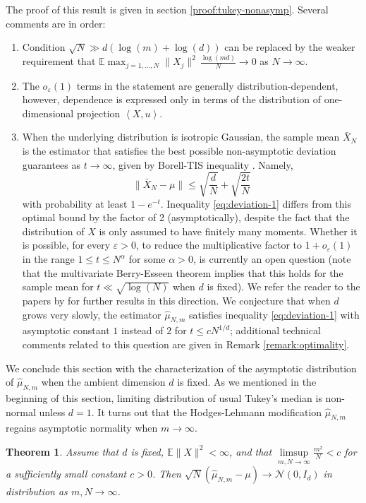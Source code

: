 \documentclass[12pt]{article}
\newcommand{\eps}{\varepsilon}
\newcommand{\wh}{\widehat}
\def\l{\left}
\def\r{\right}
\newcommand{\mb}{\mathbb}
\newcommand{\dotp}[2]{\left\langle#1,#2\right\rangle}
\newtheorem{theorem}{Theorem}%
\theoremstyle{thmstyletwo}%
\theoremstyle{thmstylethree}%
\begin{document}
\noindent The proof of this result is given in section \ref{proof:tukey-nonasymp}. Several comments are in order:
\begin{enumerate}
    \item[(i)] Condition $\sqrt N\gg d(\log(m)+\log(d))$ can be replaced by the weaker requirement that $\mb E\max_{j=1,\ldots,N} \|X_j\|^2\,\frac{\log(md)}{N}\to 0$ as $N\to\infty$.
    \item[(ii)] The $o_\eps(1)$ terms in the statement are generally distribution-dependent, however, dependence is expressed only in terms of the distribution of one-dimensional projection $\dotp{X}{u}$.
    \item[(iii)] 
    When the underlying distribution is isotropic Gaussian, the sample mean $\bar X_N$ is the estimator that satisfies the best possible non-asymptotic deviation guarantees as $t\to\infty$, given by Borell-TIS inequality \citep{borell1975brunn,tsirel2006norms}. Namely, 
    \[
    \|\bar X_N - \mu\|\leq \sqrt{\frac{d}{N}} + \sqrt{\frac{2t}{N}}
    \]
    with probability at least $1-e^{-t}$. 
    Inequality \eqref{eq:deviation-1} differs from this optimal bound by the factor of 2 (asymptotically), despite the fact that the distribution of $X$ is only assumed to have finitely many moments. Whether it is possible, for every $\eps>0$, to reduce the multiplicative factor to $1+o_\eps(1)$ in the range $1\leq t\leq N^{\alpha}$ for some $\alpha>0$, is currently an open question (note that the multivariate Berry-Esseen theorem \citep{gotze1991rate} implies that this holds for the sample mean for $t\ll \sqrt{\log(N)}$ when $d$ is fixed). We refer the reader to the papers by \citet{gupta2024beyond,lee2022optimal} for further results in this direction. 
    We conjecture that when $d$ grows very slowly, the estimator $\wh\mu_{N,m}$ satisfies inequality \eqref{eq:deviation-1} with asymptotic constant $1$ instead of $2$ for $t\leq cN^{1/d}$; additional technical comments related to this question are given in Remark \ref{remark:optimality}.
\end{enumerate}
We conclude this section with the characterization of the asymptotic distribution of $\wh\mu_{N,m}$ when the ambient dimension $d$ is fixed. As we mentioned in the beginning of this section, limiting distribution of usual Tukey's median is non-normal unless $d=1$. It turns out that the Hodges-Lehmann modification $\wh\mu_{N,m}$ regains asymptotic normality when $m\to\infty$. 
\begin{theorem}
\label{thm:normality}
    Assume that $d$ is fixed, $\mb E\|X\|^2<\infty$, and that $\limsup\limits_{m,N \rightarrow \infty}\frac{m^2}{N} < c$ for a sufficiently small constant $c>0$.
Then $\sqrt{N}\l(\wh\mu_{N,m} - \mu\r) \rightarrow \mathcal{N}(0, I_d)$ in distribution as $m,N\to\infty$.
\end{theorem}
\end{document}

